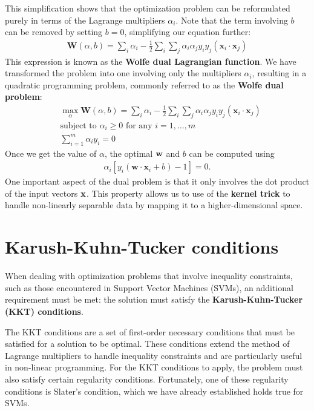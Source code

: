 This simplification shows that the optimization problem can be reformulated purely in terms of the Lagrange multipliers $\alpha_i$. Note that the term involving $b$ can be removed by setting $b=0$, simplifying our equation further:
\begin{align}
	 \mathbf{W}(\alpha, b) = \sum_i \alpha_i -\frac{1}{2}\sum_i\sum_j \alpha_i\alpha_j y_iy_j (\mathbf{x}_i\cdot \mathbf{x}_j)
	 \label{eq:dual_form}
\end{align}
This expression is known as the \textbf{Wolfe dual Lagrangian function}. We have transformed the problem into one involving only the multipliers $\alpha_i$, resulting in a quadratic programming problem, commonly referred to as the \textbf{Wolfe dual problem}:
\begin{align*}
	 &\max_\alpha \mathbf{W}(\alpha, b) = \sum_i \alpha_i -\frac{1}{2}\sum_i\sum_j \alpha_i\alpha_j y_iy_j (\mathbf{x}_i\cdot \mathbf{x}_j)\\
	 &\textrm{subject to } \alpha_i\geq 0 \textrm{ for any } i=1,\dots,m\\
	 & \sum_{i=1}^m \alpha_iy_i=0
\end{align*}
Once we get the value of $\alpha$, the optimal ${\mathbf{w}}$ and $b$ can be computed using 
\begin{align*} 
	\alpha_i \left[ y_i(\mathbf{w} \cdot \mathbf{x}_i + b) - 1 \right] = 0. 
\end{align*}
One important aspect of the dual problem is that it only involves the dot product of the input vectors ${\mathbf{x}}$. This property allows us to use of the \textbf{kernel trick} to handle non-linearly separable data by mapping it to a higher-dimensional space. 



\section{Karush-Kuhn-Tucker conditions }

When dealing with optimization problems that involve inequality constraints, such as those encountered in Support Vector Machines (SVMs), an additional requirement must be met: the solution must satisfy the \textbf{Karush-Kuhn-Tucker (KKT) conditions}.

The KKT conditions are a set of first-order necessary conditions that must be satisfied for a solution to be optimal. These conditions extend the method of Lagrange multipliers to handle inequality constraints and are particularly useful in non-linear programming. For the KKT conditions to apply, the problem must also satisfy certain regularity conditions. Fortunately, one of these regularity conditions is Slater’s condition, which we have already established holds true for SVMs.

